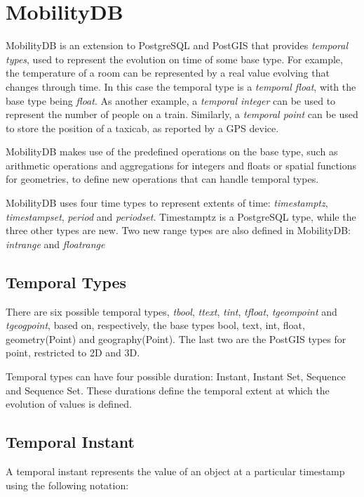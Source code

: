 \section{MobilityDB}

MobilityDB  is an extension to PostgreSQL and PostGIS that provides \textit{temporal types}, used to represent the evolution on time of some base type. For example, the temperature of a room can be represented by a real value evolving that changes through time. In this case the temporal type is a \textit{temporal float}, with the base type being \textit{float}. As another example, a \textit{temporal integer} can be used to represent the number of people on a train. Similarly, a \textit{temporal point} can be used to store the position of a taxicab, as reported by a GPS device.

MobilityDB makes use of the predefined operations on the base type, such as arithmetic operations and aggregations for integers and floats or spatial functions for geometries, to define new operations that can handle temporal types.

MobilityDB uses four time types to represent extents of time: \textit{timestamptz}, \textit{timestampset}, \textit{period} and \textit{periodset}. Timestamptz is a PostgreSQL type, while the three other types are new. Two new range types are also defined in MobilityDB: \textit{intrange} and \textit{floatrange}

\subsection{Temporal Types}

There are six possible temporal types, \textit{tbool}, \textit{ttext}, \textit{tint}, \textit{tfloat}, \textit{tgeompoint} and \textit{tgeogpoint}, based on, respectively, the base types bool, text, int, float, geometry(Point) and geography(Point). The last two are the PostGIS types for point, restricted to 2D and 3D.

Temporal types can have four possible duration: Instant, Instant Set, Sequence and Sequence Set. These durations define the temporal extent at which the evolution of values is defined.

\subsection{Temporal Instant}

A temporal instant represents the value of an object at a particular timestamp using the following notation:

